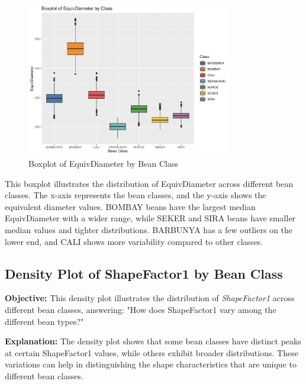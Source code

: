 \documentclass[a4paper,12pt]{article}
\begin{document}
\begin{figure}[H]
    \centering
    \includegraphics[width=0.8\textwidth]{graphs/boxplot_equivdiameter.png}
    \caption{Boxplot of EquivDiameter by Bean Class}
    \label{fig:boxplot_equivdiameter}
\end{figure}
This boxplot illustrates the distribution of EquivDiameter across different bean classes. The x-axis represents the bean classes, and the y-axis shows the equivalent diameter values. BOMBAY beans have the largest median EquivDiameter with a wider range, while SEKER and SIRA beans have smaller median values and tighter distributions. BARBUNYA has a few outliers on the lower end, and CALI shows more variability compared to other classes.

\newpage

\subsection{Density Plot of ShapeFactor1 by Bean Class}
\noindent\textbf{Objective:} This density plot illustrates the distribution of \textit{ShapeFactor1} across different bean classes, answering: "How does ShapeFactor1 vary among the different bean types?"

\noindent\textbf{Explanation:} The density plot shows that some bean classes have distinct peaks at certain ShapeFactor1 values, while others exhibit broader distributions. These variations can help in distinguishing the shape characteristics that are unique to different bean classes.
\end{document}
